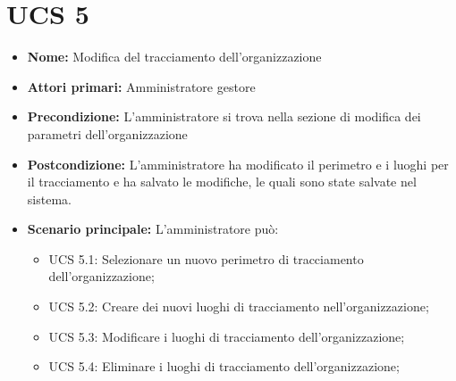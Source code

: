 \section{UCS 5}%
\begin{itemize}
    \item \textbf{Nome:} Modifica del tracciamento dell'organizzazione
    \item \textbf{Attori primari:} Amministratore gestore
    \item \textbf{Precondizione:} L'amministratore si trova nella sezione di modifica dei parametri dell'organizzazione
    \item \textbf{Postcondizione:} L'amministratore ha modificato il perimetro e i luoghi per il tracciamento e ha salvato le modifiche, le quali sono state salvate nel sistema.
    \item \textbf{Scenario principale:} L'amministratore può:
    \begin{itemize}
        \item UCS 5.1: Selezionare un nuovo perimetro di tracciamento dell'organizzazione;
        \item UCS 5.2: Creare dei nuovi luoghi di tracciamento nell'organizzazione;
        \item UCS 5.3: Modificare i luoghi di tracciamento dell'organizzazione;
        \item UCS 5.4: Eliminare i luoghi di tracciamento dell'organizzazione;
    \end{itemize}
    
     
\end{itemize}


